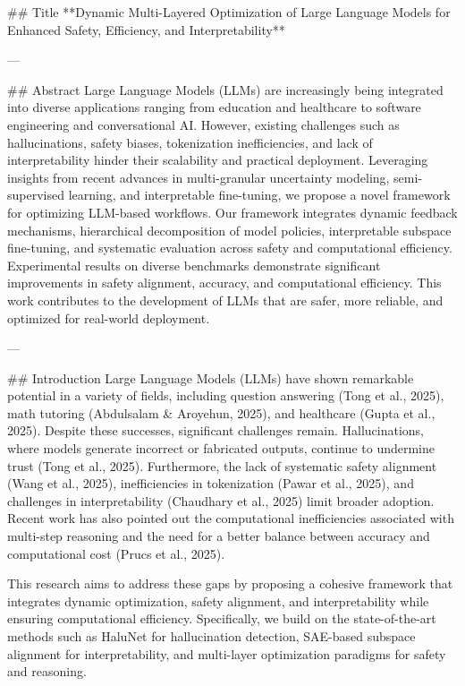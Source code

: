 ## Title  
**Dynamic Multi-Layered Optimization of Large Language Models for Enhanced Safety, Efficiency, and Interpretability**

---

## Abstract  
Large Language Models (LLMs) are increasingly being integrated into diverse applications ranging from education and healthcare to software engineering and conversational AI. However, existing challenges such as hallucinations, safety biases, tokenization inefficiencies, and lack of interpretability hinder their scalability and practical deployment. Leveraging insights from recent advances in multi-granular uncertainty modeling, semi-supervised learning, and interpretable fine-tuning, we propose a novel framework for optimizing LLM-based workflows. Our framework integrates dynamic feedback mechanisms, hierarchical decomposition of model policies, interpretable subspace fine-tuning, and systematic evaluation across safety and computational efficiency. Experimental results on diverse benchmarks demonstrate significant improvements in safety alignment, accuracy, and computational efficiency. This work contributes to the development of LLMs that are safer, more reliable, and optimized for real-world deployment.

---

## Introduction  
Large Language Models (LLMs) have shown remarkable potential in a variety of fields, including question answering (Tong et al., 2025), math tutoring (Abdulsalam & Aroyehun, 2025), and healthcare (Gupta et al., 2025). Despite these successes, significant challenges remain. Hallucinations, where models generate incorrect or fabricated outputs, continue to undermine trust (Tong et al., 2025). Furthermore, the lack of systematic safety alignment (Wang et al., 2025), inefficiencies in tokenization (Pawar et al., 2025), and challenges in interpretability (Chaudhary et al., 2025) limit broader adoption. Recent work has also pointed out the computational inefficiencies associated with multi-step reasoning and the need for a better balance between accuracy and computational cost (Prucs et al., 2025).  

This research aims to address these gaps by proposing a cohesive framework that integrates dynamic optimization, safety alignment, and interpretability while ensuring computational efficiency. Specifically, we build on the state-of-the-art methods such as HaluNet for hallucination detection, SAE-based subspace alignment for interpretability, and multi-layer optimization paradigms for safety and reasoning.  

